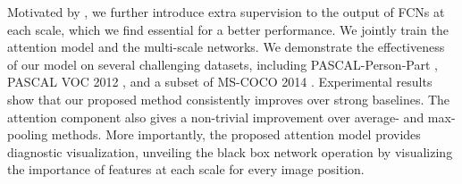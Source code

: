 
Motivated by \cite{bengio2007greedy, lee2014deeply, szegedy2014going, xie2015holistically}, we further introduce extra supervision to the output of FCNs at each scale, which we find essential for a better performance. We jointly train the attention model and the multi-scale networks. We demonstrate the effectiveness of our model on several challenging datasets, including PASCAL-Person-Part \cite{chen_cvpr14}, PASCAL VOC 2012 \cite{everingham2014pascal}, and a
subset of MS-COCO 2014 \cite{lin2014microsoft}. Experimental results show that our proposed method consistently improves over strong baselines. The attention component also gives a non-trivial improvement over average- and max-pooling methods. More importantly, the proposed attention model provides diagnostic visualization, unveiling the black box network operation by visualizing the importance of features at each scale for every image position.

